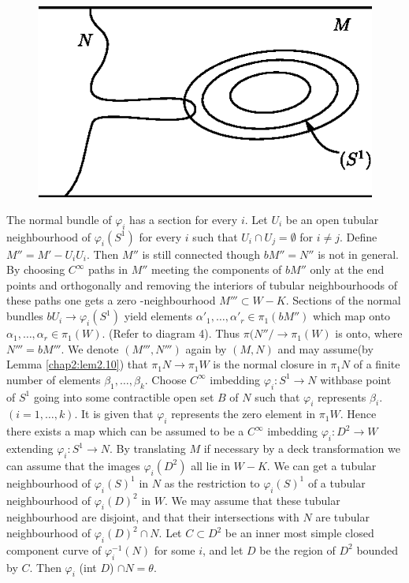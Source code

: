 \begin{figure}[H]
\centering
\includegraphics{vol46-fig/fig46-3.eps}
\end{figure}\pageoriginale

The normal bundle of $\varphi_i$ has a section for every $i$. Let $U_i$
be an open tubular neighbourhood of $\varphi_i(S^1)$ for every $i$
such that $U_i\cap U_j = \emptyset$ for $i \neq j$. Define $M'' = M' -
U_i U_i$. Then $M''$ is still  connected though $bM'' = N''$ is not in
general. By choosing $C^\infty$ paths in $M''$ meeting the components
of $bM''$ only at the end points and orthogonally and removing the
interiors of tubular neighbourhoods of these paths one gets a zero
-neighbourhood $M''' \subset W - K$. Sections of the normal bundles
$bU_i \to \varphi_i (S^1)$ yield elements $\alpha'_1, \ldots,
\alpha'_r \in \pi_1 (bM'') $ which map onto $ \alpha_1,
\ldots,\alpha_r \in \pi_1 (W)$. (Refer to diagram 4). Thus $\pi
(N''/ \to \pi_1 (W)$ is onto, where $N''' = bM'''$. We denote $(M''',
N''')$ again by $(M, N)$ and may assume(by Lemma \ref{chap2:lem2.10}) that $\pi_1 N
\to \pi_1 W$ is the normal closure in $\pi_1 N$ of a finite number of
elements $\beta_1,\ldots, \beta_k$. Choose $C^\infty$ imbedding
$\varphi_i : S^1 \to N$ with\pageoriginale base point of $S^1$ going into
some contractible 
open set $B$ of $N$ such that $\varphi_i$ represents $\beta_i$. $(i =
1,\ldots, k)$. It is given that $\varphi_i $ represents the zero element
in $\pi _1 W$.  Hence there exists a map which can be assumed to be a
$C^ \infty$ imbedding $\varphi_i : D^2 \to W$ extending $\varphi_i : S^1 \to
N$. By translating $M$ if necessary by a deck transformation we can
assume that the images $\varphi_i (D^2)$ all lie in $W - K$. We can get a
tubular neighbourhood of $\varphi_i (S)^1$ in $N$ as the restriction to
$\varphi_i (S)^1$ of a tubular neighbourhood of $\varphi_i(D)^2$ in $W$.  We
may assume that these tubular neighbourhood are disjoint, and that
their intersections with $N$ are tubular neighbourhood of $\varphi_i
(D)^2 \cap N$. Let $C \subset D^2$ be an inner most simple closed
component curve of $\varphi_i^{-1} (N)$  for some $i$, and let $D$ be the
region of $D^2$ bounded by $C$. Then $\varphi_i$ (int $D$) $\cap N =
\theta$. 

